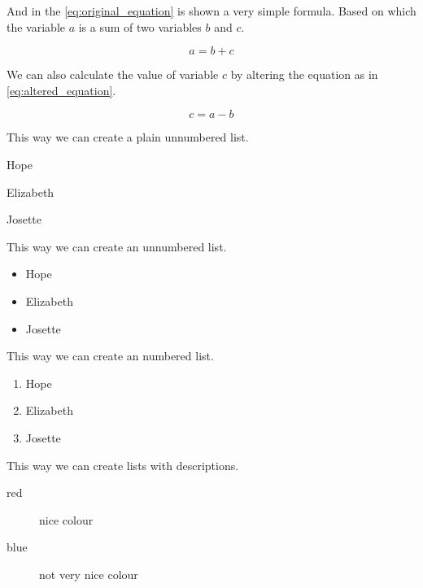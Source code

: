 And in the \eqref{eq:original_equation} is shown a very simple formula. Based on which the variable $a$ is a sum of two variables $b$ and $c$.

\begin{equation}
	\label{eq:original_equation}
	a = b + c
\end{equation}

We can also calculate the value of variable $c$ by altering the equation as in \eqref{eq:altered_equation}. 

\begin{equation}
	\label{eq:altered_equation}
	c = a - b
\end{equation}


\IEEEpubidadjcol

This way we can create a plain unnumbered list.

\begin{list}{}{}
	\item Hope
	\item Elizabeth
	\item Josette 
\end{list}

This way we can create an unnumbered list.

\begin{itemize}
	\item Hope
	\item Elizabeth
	\item Josette
\end{itemize}

This way we can create an numbered list.

\begin{enumerate} 
	\item Hope
	\item Elizabeth
	\item Josette
\end{enumerate}

This way we can create lists with descriptions.

\begin{description}
	\item[red] nice colour
	\item[blue] not very nice colour
\end{description}


